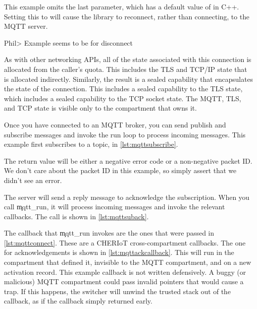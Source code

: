 This example omits the last parameter, which has a default value of  in C++.
Setting this to  will cause the library to reconnect, rather than connecting, to the MQTT server.

\codelisting[filename=examples/mqtt/mqtt.cc,marker=connect,label=lst:mqttconnect,caption="Connecting to an MQTT broker."]{}
Phil> Example seems to be for disconnect

As with other networking APIs, all of the state associated with this connection is allocated from the caller's quota.
This includes the TLS and TCP/IP state that is allocated indirectly.
Similarly, the result is a sealed capability that encapsulates the state of the connection.
This includes a sealed capability to the TLS state, which includes a sealed capability to the TCP socket state.
The MQTT, TLS, and TCP state is visible only to the compartment that owns it.

Once you have connected to an MQTT broker, you can send publish and subscribe messages and invoke the run loop to process incoming messages.
This example first subscribes to a topic, in \ref{lst:mqttsubscribe}.

\codelisting[filename=examples/mqtt/mqtt.cc,marker=subscribe,label=lst:mqttsubscribe,caption="Subscribing to an MQTT topic."]{}

The return value will be either a negative error code or a non-negative packet ID.
We don't care about the packet ID in this example, so simply assert that we didn't see an error.


The server will send a reply message to acknowledge the subscription.
When you call \c{mqtt_run}, it will process incoming messages and invoke the relevant callbacks.
The call is shown in \ref{lst:mqttsuback}.

\codelisting[filename=examples/mqtt/mqtt.cc,marker=suback,label=lst:mqttsuback,caption="Waiting for acknowledgement after subscribing to an MQTT topic."]{}

The callback that \c{mqtt_run} invokes are the ones that were passed in \ref{lst:mqttconnect}.
These are a CHERIoT cross-compartment callbacks.
The one for acknowledgements is shown in \ref{lst:mqttackcallback}.
This will run in the compartment that defined it, invisible to the MQTT compartment, and on a new  activation record.
This example callback is not written defensively.
A buggy (or malicious) MQTT compartment could pass invalid pointers that would cause a trap.
If this happens, the switcher will unwind the trusted stack out of the callback, as if the callback simply returned early.

